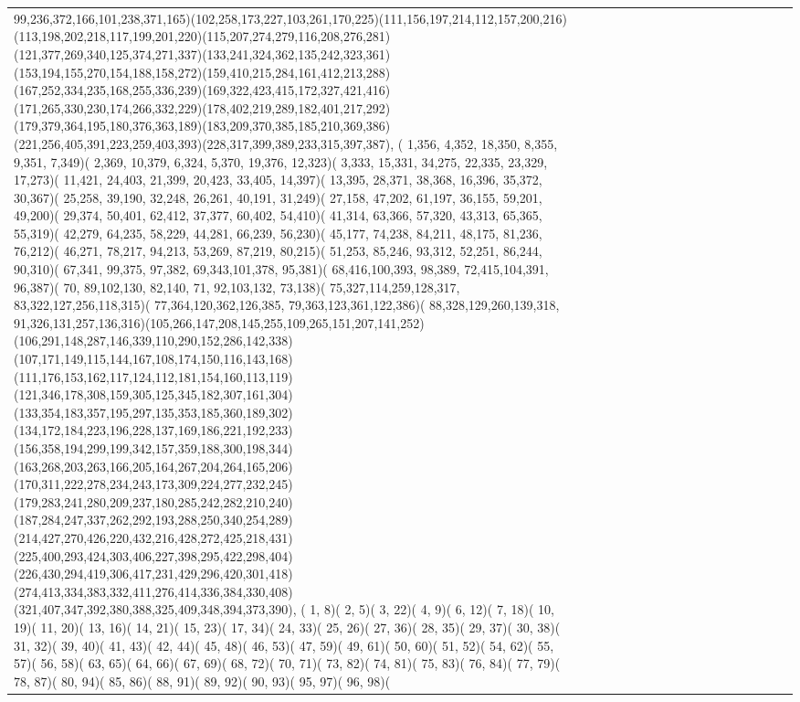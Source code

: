\documentclass[varwidth=\maxdimen,border=10]{standalone}
\begin{document}
\begin{tabular}{@{}l@{}l@{}l@{}l@{}l@{}l@{}l@{}l@{}l@{}l@{}l@{}l@{}l@{}l@{}l@{}l@{}l@{}l@{}}
99,236,372,166,101,238,371,165)(102,258,173,227,103,261,170,225)(111,156,197,214,112,157,200,216)(113,198,202,218,117,199,201,220)(115,207,274,279,116,208,276,281)(121,377,269,340,125,374,271,337)(133,241,324,362,135,242,323,361)(153,194,155,270,154,188,158,272)(159,410,215,284,161,412,213,288)(167,252,334,235,168,255,336,239)(169,322,423,415,172,327,421,416)(171,265,330,230,174,266,332,229)(178,402,219,289,182,401,217,292)(179,379,364,195,180,376,363,189)(183,209,370,385,185,210,369,386)(221,256,405,391,223,259,403,393)(228,317,399,389,233,315,397,387), (  1,356,  4,352, 18,350,  8,355,  9,351,  7,349)(  2,369, 10,379,  6,324,  5,370, 19,376, 12,323)(  3,333, 15,331, 34,275, 22,335, 23,329, 17,273)( 11,421, 24,403, 21,399, 20,423, 33,405, 14,397)( 13,395, 28,371, 38,368, 16,396, 35,372, 30,367)( 25,258, 39,190, 32,248, 26,261, 40,191, 31,249)( 27,158, 47,202, 61,197, 36,155, 59,201, 49,200)( 29,374, 50,401, 62,412, 37,377, 60,402, 54,410)( 41,314, 63,366, 57,320, 43,313, 65,365, 55,319)( 42,279, 64,235, 58,229, 44,281, 66,239, 56,230)( 45,177, 74,238, 84,211, 48,175, 81,236, 76,212)( 46,271, 78,217, 94,213, 53,269, 87,219, 80,215)( 51,253, 85,246, 93,312, 52,251, 86,244, 90,310)( 67,341, 99,375, 97,382, 69,343,101,378, 95,381)( 68,416,100,393, 98,389, 72,415,104,391, 96,387)( 70, 89,102,130, 82,140, 71, 92,103,132, 73,138)( 75,327,114,259,128,317, 83,322,127,256,118,315)( 77,364,120,362,126,385, 79,363,123,361,122,386)( 88,328,129,260,139,318, 91,326,131,257,136,316)(105,266,147,208,145,255,109,265,151,207,141,252)(106,291,148,287,146,339,110,290,152,286,142,338)(107,171,149,115,144,167,108,174,150,116,143,168)(111,176,153,162,117,124,112,181,154,160,113,119)(121,346,178,308,159,305,125,345,182,307,161,304)(133,354,183,357,195,297,135,353,185,360,189,302)(134,172,184,223,196,228,137,169,186,221,192,233)(156,358,194,299,199,342,157,359,188,300,198,344)(163,268,203,263,166,205,164,267,204,264,165,206)(170,311,222,278,234,243,173,309,224,277,232,245)(179,283,241,280,209,237,180,285,242,282,210,240)(187,284,247,337,262,292,193,288,250,340,254,289)(214,427,270,426,220,432,216,428,272,425,218,431)(225,400,293,424,303,406,227,398,295,422,298,404)(226,430,294,419,306,417,231,429,296,420,301,418)(274,413,334,383,332,411,276,414,336,384,330,408)(321,407,347,392,380,388,325,409,348,394,373,390), (  1,  8)(  2,  5)(  3, 22)(  4,  9)(  6, 12)(  7, 18)( 10, 19)( 11, 20)( 13, 16)( 14, 21)( 15, 23)( 17, 34)( 24, 33)( 25, 26)( 27, 36)( 28, 35)( 29, 37)( 30, 38)( 31, 32)( 39, 40)( 41, 43)( 42, 44)( 45, 48)( 46, 53)( 47, 59)( 49, 61)( 50, 60)( 51, 52)( 54, 62)( 55, 57)( 56, 58)( 63, 65)( 64, 66)( 67, 69)( 68, 72)( 70, 71)( 73, 82)( 74, 81)( 75, 83)( 76, 84)( 77, 79)( 78, 87)( 80, 94)( 85, 86)( 88, 91)( 89, 92)( 90, 93)( 95, 97)( 96, 98)( 
\end{tabular}
\end{document}
